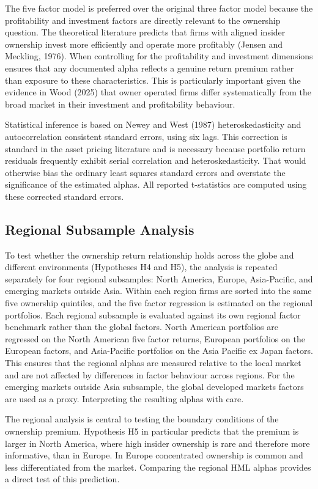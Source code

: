 The five factor model is preferred over the original three factor model because the profitability and investment factors are directly relevant to the ownership question. The theoretical literature predicts that firms with aligned insider ownership invest more efficiently and operate more profitably (Jensen and Meckling, 1976). When controlling for the profitability and investment dimensions ensures that any documented alpha reflects a genuine return premium rather than exposure to these characteristics. This is particularly important given the evidence in Wood (2025) that owner operated firms differ systematically from the broad market in their investment and profitability behaviour.

Statistical inference is based on Newey and West (1987) heteroskedasticity and autocorrelation consistent standard errors, using six lags. This correction is standard in the asset pricing literature and is necessary because portfolio return residuals frequently exhibit serial correlation and heteroskedasticity. That would otherwise bias the ordinary least squares standard errors and overstate the significance of the estimated alphas. All reported t-statistics are computed using these corrected standard errors.


\subsection{Regional Subsample Analysis}

To test whether the ownership return relationship holds across the globe and different environments (Hypotheses H4 and H5), the analysis is repeated separately for four regional subsamples: North America, Europe, Asia-Pacific, and emerging markets outside Asia. Within each region firms are sorted into the same five ownership quintiles, and the five factor regression is estimated on the regional portfolios. Each regional subsample is evaluated against its own regional factor benchmark rather than the global factors. North American portfolios are regressed on the North American five factor returns, European portfolios on the European factors, and Asia-Pacific portfolios on the Asia Pacific ex Japan factors. This ensures that the regional alphas are measured relative to the local market and are not affected by differences in factor behaviour across regions. For the emerging markets outside Asia subsample, the global developed markets factors are used as a proxy. Interpreting the resulting alphas with care.

The regional analysis is central to testing the boundary conditions of the ownership premium. Hypothesis H5 in particular predicts that the premium is larger in North America, where high insider ownership is rare and therefore more informative, than in Europe. In Europe concentrated ownership is common and less differentiated from the market. Comparing the regional HML alphas provides a direct test of this prediction.


